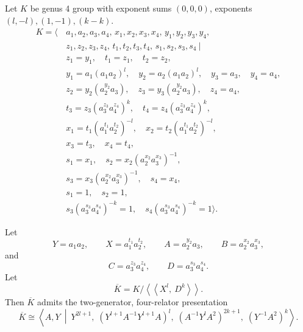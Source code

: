 \documentclass[10pt,a4paper]{amsart}
\begin{document}
\begin{prop} Let \(K\)  be genus 4 group with exponent sums $(0,0,0)$, exponents $(l,-l),(1,-1),(k-k)$.
\[
\begin{aligned}
K=\big\langle\,&
a_1,a_2,a_3,a_4,\,
x_1,x_2,x_3,x_4,\,
y_1,y_2,y_3,y_4,\\
& z_1,z_2,z_3,z_4,\,
t_1,t_2,t_3,t_4,\,
s_1,s_2,s_3,s_4
\ \big|\ \\[2mm]
& z_1=y_1,\quad
  t_1=z_1,\quad
  t_2=z_2,\\
& y_1=a_1(a_1a_2)^l,\quad
  y_2=a_2(a_1a_2)^l,\quad
  y_3=a_3,\quad
  y_4=a_4,\\
& z_2=y_2(a_2^{y_2}a_3),\quad
  z_3=y_3(a_2^{y_2}a_3),\quad
  z_4=a_4,\\
& t_3=z_3(a_3^{z_3}a_4^{z_4})^k,\quad
  t_4=z_4(a_3^{z_3}a_4^{z_4})^k,\\
& x_1=t_1(a_1^{t_1}a_2^{t_2})^{-l},\quad
  x_2=t_2(a_1^{t_1}a_2^{t_2})^{-l},\\
& x_3=t_3,\quad
  x_4=t_4,\\
& s_1=x_1,\quad
  s_2=x_2(a_2^{x_2}a_3^{x_3})^{-1},\\
& s_3=x_3(a_2^{x_2}a_3^{x_3})^{-1},\quad
  s_4=x_4,\\
& s_1=1,\quad
  s_2=1,\\
& s_3(a_3^{s_3}a_4^{s_4})^{-k}=1,\quad
  s_4(a_3^{s_3}a_4^{s_4})^{-k}=1
\big\rangle .
\end{aligned}
\]

Let
\[
Y=a_1a_2,\qquad
X=a_1^{t_1}a_2^{t_2},\qquad
A=a_2^{y_2}a_3,\qquad
B=a_2^{x_2}a_3^{x_3},
\]
and
\[
C=a_3^{z_3}a_4^{z_4},
\qquad
D=a_3^{s_3}a_4^{s_4}.
\]
 Let
\[
\overline{K}
=
K/\left\langle\!\left\langle X^l,\ D^k\right\rangle\!\right\rangle .
\]
Then \(\overline{K}\) admits the two-generator, four-relator presentation
\[
{
\overline{K}
\cong
\left\langle A,Y \ \middle|\ 
Y^{2l+1},\;
\left(Y^{l+1}A^{-1}Y^{l+1}A\right)^l,\;
\left(A^{-1}Y^lA^2\right)^{2k+1},\;
\left(Y^{-1}A^2\right)^k
\right\rangle .
}\]

\end{prop}
\end{document}

